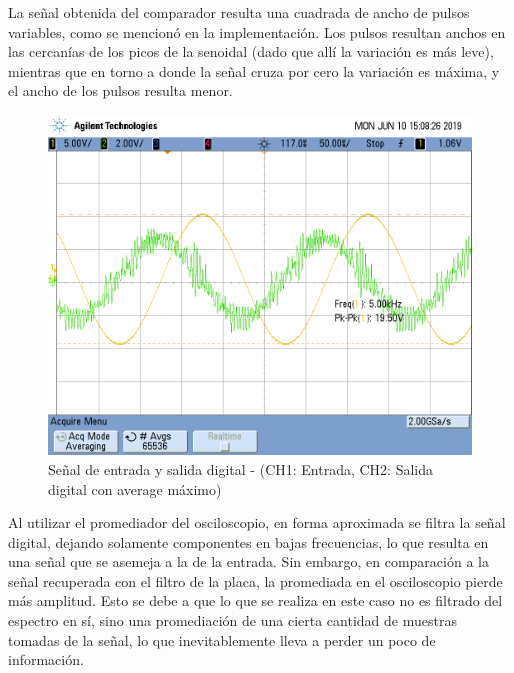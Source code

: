 \documentclass[assd_tp3_main.tex]{subfiles}
\begin{document}
La señal obtenida del comparador resulta una cuadrada de ancho de pulsos variables, como se mencionó en la implementación. Los pulsos resultan anchos en las cercanías de los picos de la senoidal (dado que allí la variación es más leve), mientras que en torno a donde la señal cruza por cero la variación es máxima, y el ancho de los pulsos resulta menor.

\begin{figure}[!ht]
\begin{centering}
\includegraphics[scale=0.25]{../EJ4/Mediciones/Seno/s1_4.png}
\par\end{centering}
\caption{Señal de entrada y salida digital - (CH1: Entrada, CH2: Salida digital con average máximo)}
\end{figure}

Al utilizar el promediador del osciloscopio, en forma aproximada se filtra la señal digital, dejando solamente componentes en bajas frecuencias, lo que resulta en una señal que se asemeja a la de la entrada. Sin embargo, en comparación a la señal recuperada con el filtro de la placa, la promediada en el osciloscopio pierde más amplitud. Esto se debe a que lo que se realiza en este caso no es filtrado del espectro en sí, sino una promediación de una cierta cantidad de muestras tomadas de la señal, lo que inevitablemente lleva a perder un poco de información.

\newpage
\end{document}
